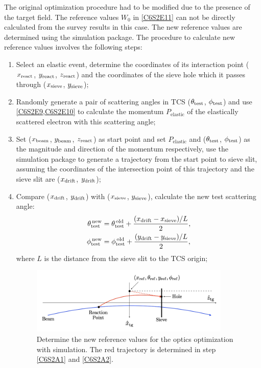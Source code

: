 The original optimization procedure had to be modified due to the presence of the target field. The reference values $W_0$ in \cref{C6S2E11} can not be directly calculated from the survey results in this case. The new reference values are determined using the simulation package. The procedure to calculate new reference values involves the following steps:
\begin{enumerate}[parsep=0pt]
\item Select an elastic event, determine the coordinates of its interaction point ($x_{\mathrm{react}}$, $y_{\mathrm{react}}$, $z_{\mathrm{react}}$) and the coordinates of the sieve hole which it passes through ($x_{\mathrm{sieve}}$, $y_{\mathrm{sieve}}$);
\item Randomly generate a pair of scattering angles in TCS ($\theta_{\mathrm{test}}$, $\phi_{\mathrm{test}}$) and use \cref{C6S2E9,C6S2E10} to calculate the momentum $P_{\mathrm{elastic}}$ of the elastically scattered electron with this scattering angle;
\item \label{C6S2A1}Set ($x_{\mathrm{beam}}$, $y_{\mathrm{beam}}$, $z_{\mathrm{react}}$) as start point and set $P_{\mathrm{elastic}}$ and ($\theta_{\mathrm{test}}$, $\phi_{\mathrm{test}}$) as the magnitude and direction of the momentum respectively, use the simulation package to generate a trajectory from the start point to sieve slit, assuming the coordinates of the intersection point of this trajectory and the sieve slit are ($x_{\mathrm{drift}}$, $y_{\mathrm{drift}}$);
\item \label{C6S2A2}Compare ($x_{\mathrm{drift}}$, $y_{\mathrm{drift}}$) with ($x_{\mathrm{sieve}}$, $y_{\mathrm{sieve}}$), calculate the new test scattering angle:
\begin{align} \label{C6S2E12}
\theta_{\mathrm{test}}^{\,\mathrm{new}} & = \theta_{\mathrm{test}}^{\,\mathrm{old}}+\frac{(x_{\mathrm{drift}}-x_{\mathrm{sieve}})/L}{2}, \\ \label{C6S2E13}
\phi_{\mathrm{test}}^{\,\mathrm{new}} & = \phi_{\mathrm{test}}^{\,\mathrm{old}}+\frac{(y_{\mathrm{drift}}-y_{\mathrm{sieve}})/L}{2},
\end{align}
where $L$ is the distance from the sieve slit to the TCS origin;

\begin{figure}[tb!]
  \centering
  \includegraphics[width=0.9\textwidth]{figs/optics-reference-value.png}
  \caption[Determine the new reference values for the optics optimization.]{Determine the new reference values for the optics optimization with simulation. The red trajectory is determined in step \ref{C6S2A1} and \ref{C6S2A2}. \label{C6S2F3}}
\end{figure}


\end{enumerate}
